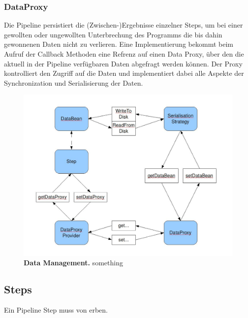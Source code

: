 \subsubsection{DataProxy}
Die Pipeline persistiert die (Zwischen-)Ergebnisse einzelner Steps, um bei
einer gewollten oder ungewollten Unterbrechung des Programms die bis dahin
gewonnenen Daten nicht zu verlieren. Eine  Implementierung bekommt
beim Aufruf der Callback Methoden eine Refrenz auf einen Data Proxy, über den
die aktuell in der Pipeline verfügbaren Daten abgefragt werden können. Der
Proxy kontrolliert den Zugriff auf die Daten und implementiert dabei alle
Aspekte der Synchronization und Serialisierung der Daten.

\begin{figure}[p]
	\begin{center}
		\includegraphics[scale=0.42]{pics/programDataManagment.jpg}
	\caption[Data Management]{
	\textbf{Data Management.}
	something}
	\end{center}
	\label{fig:programDataManagment}
\end{figure}

\subsection{Steps}
Ein Pipeline Step muss von  erben.
